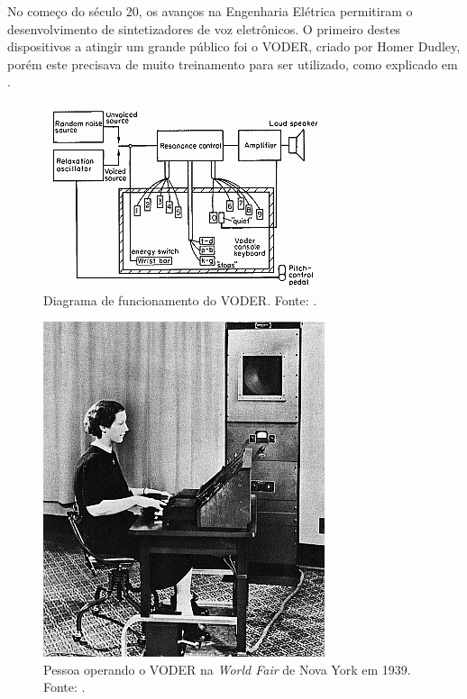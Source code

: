 \documentclass[
  12pt,       
  openright,      
  twoside,      
  a4paper,      
  english,      
  french,       
  spanish,      
  brazil,     
  ]{abntex2}
\begin{document}
No começo do século 20, os avanços na Engenharia Elétrica permitiram o desenvolvimento de sintetizadores de voz eletrônicos. O primeiro destes dispositivos a atingir um grande público foi o VODER, criado por Homer Dudley, porém este precisava de muito treinamento para ser utilizado, como explicado em .

\begin{figure}
\centering
\includegraphics{imagens/voderdiagram.png}
\caption{Diagrama de funcionamento do VODER. Fonte: .}
\label{fig:voderdiagram}
\centering
\end{figure}

\begin{figure}
\centering
\includegraphics[scale=0.7]{imagens/voderuse.png}
\caption{Pessoa operando o VODER na \textit{World Fair} de Nova York em 1939. Fonte: .}
\label{fig:voderuse}
\centering
\end{figure}
\end{document}
